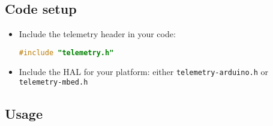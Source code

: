 \documentclass[11pt]{article}
\begin{document}
\subsection{Code setup}
\begin{itemize}
  \item Include the telemetry header in your code:
  \begin{lstlisting}[language=C++]
#include "telemetry.h"
  \end{lstlisting}
  \item Include the HAL for your platform: either \texttt{telemetry-arduino.h} or \texttt{telemetry-mbed.h}
\end{itemize}
\subsection{Usage}
\end{document}
